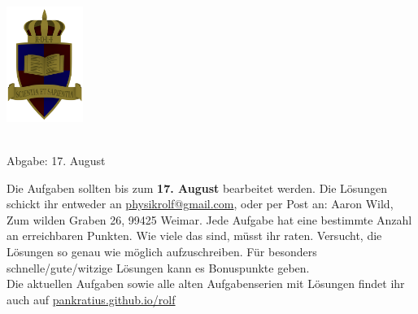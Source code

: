 \documentclass[a4paper]{article}
\begin{document}
	\vspace*{-2cm}
	\parbox{4cm}{\includegraphics[width=2.5cm]{../images/ROLF4.png}}
	\parbox{10.6cm}{ \\ Abgabe: 17. August \\ \vspace*{-.5cm} }
	
	

\thispagestyle{empty}
\begin{framed}
	\noindent
	\scriptsize
	Die Aufgaben sollten bis zum \textbf{17. August} bearbeitet werden. Die Lösungen schickt ihr entweder an \href{mailto:physikrolf@gmail.com}{physikrolf@gmail.com}, oder per Post an: Aaron Wild, Zum wilden Graben 26, 99425 Weimar.
	Jede Aufgabe hat eine bestimmte Anzahl an erreichbaren Punkten. Wie viele das sind, müsst ihr raten. Versucht, die Lösungen so genau wie möglich aufzuschreiben. Für besonders schnelle/gute/witzige Lösungen kann es Bonuspunkte geben.\\ Die aktuellen Aufgaben sowie alle alten Aufgabenserien mit Lösungen findet ihr auch auf \url{pankratius.github.io/rolf}
\end{framed}

\noindent





%
%
\end{document}
